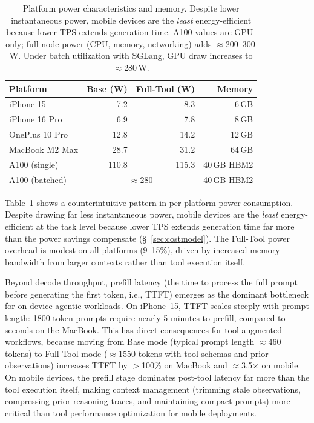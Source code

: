 \documentclass[sigconf,anonymous,review]{acmart}
\begin{document}
\begin{table}[t]
\centering
\caption{Platform power characteristics and memory. Despite lower instantaneous power, mobile devices are the \emph{least} energy-efficient because lower TPS extends generation time. A100 values are GPU-only; full-node power (CPU, memory, networking) adds $\approx$200--300\,W. Under batch utilization with SGLang, GPU draw increases to $\approx$280\,W.}
\label{tab:power}
\small
\begin{tabular}{@{} l r r r @{}}
\toprule
\textbf{Platform} & \textbf{Base (W)} & \textbf{Full-Tool (W)} & \textbf{Memory} \\
\midrule
iPhone 15        & 7.2  & 8.3  & 6\,GB \\
iPhone 16 Pro    & 6.9  & 7.8  & 8\,GB \\
OnePlus 10 Pro   & 12.8 & 14.2 & 12\,GB \\
MacBook M2 Max   & 28.7 & 31.2 & 64\,GB \\
A100 (single)    & 110.8& 115.3& 40\,GB HBM2 \\
A100 (batched)   & \multicolumn{2}{c}{$\approx$280} & 40\,GB HBM2 \\
\bottomrule
\end{tabular}
\end{table}

Table~\ref{tab:power} shows a counterintuitive pattern in per-platform power consumption. Despite drawing far less instantaneous power, mobile devices are the \emph{least} energy-efficient at the task level because lower TPS extends generation time far more than the power savings compensate (§~\ref{sec:costmodel}). The Full-Tool power overhead is modest on all platforms (9--15\%), driven by increased memory bandwidth from larger contexts rather than tool execution itself.

Beyond decode throughput, prefill latency (the time to process the full prompt before generating the first token, i.e., TTFT) emerges as the dominant bottleneck for on-device agentic workloads. On iPhone~15, TTFT scales steeply with prompt length: 1800-token prompts require nearly 5 minutes to prefill, compared to seconds on the MacBook. This has direct consequences for tool-augmented workflows, because moving from Base mode (typical prompt length $\approx$460 tokens) to Full-Tool mode ($\approx$1550 tokens with tool schemas and prior observations) increases TTFT by $>$100\% on MacBook and $\approx$3.5$\times$ on mobile. On mobile devices, the prefill stage dominates post-tool latency far more than the tool execution itself, making context management (trimming stale observations, compressing prior reasoning traces, and maintaining compact prompts) more critical than tool performance optimization for mobile deployments.
\end{document}
